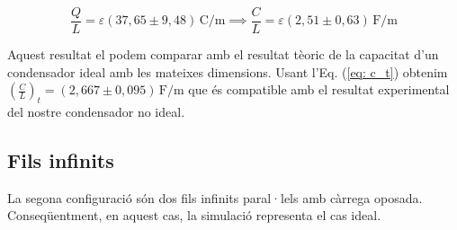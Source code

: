 \documentclass[11pt]{article}
\begin{document}
\[
\frac{Q}{L} = \varepsilon  (37{,}65 \pm 9{,}48)\, \mathrm{C/m} \implies
\boxed{ \frac{C}{L} = \varepsilon  (2{,}51 \pm 0{,}63)\, \mathrm{F/m} }
\]    

Aquest resultat el podem comparar amb el resultat tèoric de la capacitat d'un condensador ideal amb les mateixes dimensions. Usant l'Eq. (\ref{eq: c_t}) obtenim $(\frac{C}{L})_t =(2,667 \pm 0,095)\, \mathrm{F/m}$ que és compatible amb el resultat experimental del nostre condensador no ideal.

\subsection{Fils infinits}\label{sec: fils}
La segona configuració són dos fils infinits paral·lels amb càrrega oposada. Conseqüentment, en aquest cas, la simulació representa el cas ideal.
\end{document}
